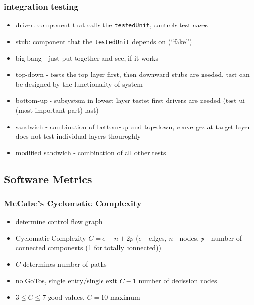 \documentclass[a4paper, 10pt]{article}
\begin{document}
\subsubsection*{integration testing}
\begin{itemize}
	\item driver: component that calls the \texttt{testedUnit}, controls test cases
	\item stub: component that the \texttt{testedUnit} depends on (``fake'')
	\item big bang - just put together and see, if it works
	\item top-down - tests the top layer first, then downward \follows stubs are needed, test can be designed by the functionality of system
	\item bottom-up - subsystem in lowest layer testet first \follows drivers are needed (test ui (most important part) last)
	\item sandwich - combination of bottom-up and top-down, converges at target layer \follows does not test individual layers thouroghly
	\item modified sandwich - combination of all other tests
\end{itemize}

\subsection*{Software Metrics}
\subsubsection*{McCabe's Cyclomatic Complexity}
\begin{itemize}
	\item determine control flow graph
	\item Cyclomatic Complexity $C=e-n+2p$ ($e$ - edges, $n$ - nodes, $p$ - number of connected components (1 for totally connected)) \\
	\item $C$ determines number of paths
	\item no GoTos, single entry/single exit \follows $C-1$ number of decission nodes
	\item $3\leq C\leq 7$ \follows good values, $C=10$ \follows maximum
\end{itemize}
\end{document}
